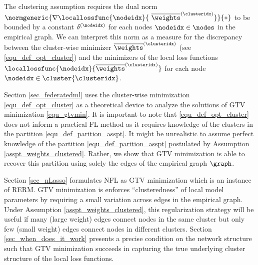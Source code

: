 \documentclass[lettersize,journal]{IEEEtran}
\newcommand\clusteropterr[1]{\delta^{(#1)}}
\begin{document}
The clustering assumption requires the dual norm $\normgeneric{\nabla \locallossfunc{\nodeidx}{\ \overline{\weights}^{(\clusteridx)}}}{*}$ 
to be bounded by a constant $\clusteropterr{\nodeidx}$ for each nodes $\nodeidx \in \nodes $ in the empirical graph. 
We can interpret this norm as a measure for the discrepancy between the cluster-wise minimizer $\overline{\weights}^{(\clusteridx)}$ 
(see \eqref{equ_def_opt_cluster}) and the minimizers of the local loss functions $\locallossfunc{\nodeidx}{\overline{\weights}^{(\clusteridx)}}$ 
for each node $\nodeidx \in \cluster{\clusteridx}$. 

Section \ref{sec_federatedml} uses the cluster-wise minimization \eqref{equ_def_opt_cluster} as a 
theoretical device to analyze the solutions of GTV minimization \eqref{equ_gtvmin}. It is important to 
note that \eqref{equ_def_opt_cluster} does not inform a practical FL method as it requires knowledge 
of the clusters in the partition \eqref{equ_def_parition_asspt}. It might be unrealistic to assume perfect 
knowledge of the partition \eqref{equ_def_parition_asspt} postulated by Assumption \ref{asspt_weights_clustered}. 
Rather, we show that GTV minimization is able to recover this partition using solely the edges of the empirical 
graph $\graph$. 

Section \ref{sec_nLasso} formulates NFL as GTV minimization which is an instance of RERM. GTV minimization is 
enforces ``clusteredness'' of local model parameters by requiring a small variation across edges in the 
empirical graph. Under Assumption \ref{asspt_weights_clustered}, this regularization strategy will be useful if many (large weight) 
edges connect nodes in the same cluster but only few (small weight) edges connect nodes in different clusters. 
Section \ref{sec_when_does_it_work} presents a precise condition on the network structure such that GTV 
minimization succeeds in capturing the true underlying cluster structure of the local loss functions. 

\end{document}
